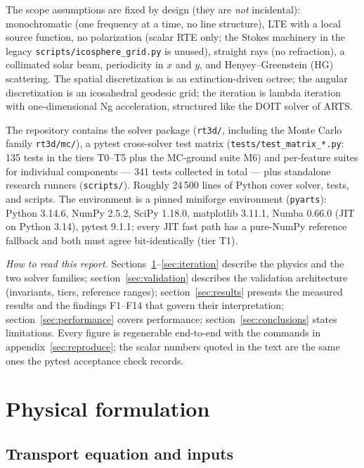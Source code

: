 \documentclass[11pt,a4paper]{article}
\begin{document}
The scope assumptions are fixed by design (they are \emph{not} incidental):
monochromatic (one frequency at a time, no line structure), LTE with a
local source function, no polarization (scalar RTE only; the Stokes
machinery in the legacy \texttt{scripts/icosphere\_grid.py} is unused),
straight rays (no refraction), a collimated solar beam, periodicity in
$x$ and $y$, and Henyey--Greenstein (HG) scattering. The spatial
discretization is an extinction-driven octree; the angular discretization
is an icosahedral geodesic grid; the iteration is lambda iteration with
one-dimensional Ng acceleration, structured like the DOIT solver of ARTS.

The repository contains the solver package (\texttt{rt3d/}, including the
Monte Carlo family \texttt{rt3d/mc/}), a pytest cross-solver test matrix
(\texttt{tests/test\_matrix\_*.py}: 135 tests in the tiers T0--T5 plus the
MC-ground suite M6) and per-feature suites for individual components ---
341 tests collected in total --- plus standalone research runners
(\texttt{scripts/}). Roughly 24\,500 lines of Python cover solver,
tests, and scripts. The environment is a pinned miniforge environment
(\texttt{pyarts}): Python 3.14.6, NumPy 2.5.2, SciPy 1.18.0,
matplotlib 3.11.1, Numba 0.66.0 (JIT on Python 3.14), pytest 9.1.1; every
JIT fast path has a pure-NumPy reference fallback and both must agree
bit-identically (tier T1).

\emph{How to read this report.} Sections~\ref{sec:formulation}--\ref{sec:iteration}
describe the physics and the two solver families; section~\ref{sec:validation}
describes the validation architecture (invariants, tiers, reference ranges);
section~\ref{sec:results} presents the measured results and the findings
F1--F14 that govern their interpretation; section~\ref{sec:performance}
covers performance; section~\ref{sec:conclusions} states limitations.
Every figure is regenerable end-to-end with the commands in
appendix~\ref{sec:reproduce}; the scalar numbers quoted in the text are the
same ones the pytest acceptance check records.

\section{Physical formulation}
\label{sec:formulation}

\subsection{Transport equation and inputs}
\end{document}
